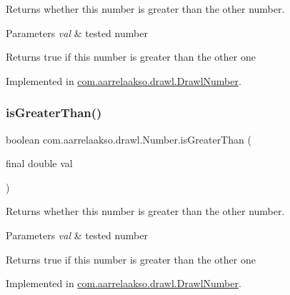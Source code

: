 Returns whether this number is greater than the other number. 


\begin{DoxyParams}{Parameters}
{\em val} & tested number \\
\hline
\end{DoxyParams}
\begin{DoxyReturn}{Returns}
true if this number is greater than the other one 
\end{DoxyReturn}


Implemented in \hyperlink{classcom_1_1aarrelaakso_1_1drawl_1_1_drawl_number_a17616696cef2e7b72d2614481182293a}{com.\+aarrelaakso.\+drawl.\+Drawl\+Number}.

\mbox{\label{interfacecom_1_1aarrelaakso_1_1drawl_1_1_number_ab3c02c742e083e6850ee6d2fe88e985b}} 
\subsubsection{\texorpdfstring{is\+Greater\+Than()}{isGreaterThan()}\hspace{0.1cm}{\footnotesize\ttfamily [2/2]}}
{\footnotesize\ttfamily boolean com.\+aarrelaakso.\+drawl.\+Number.\+is\+Greater\+Than (\begin{DoxyParamCaption}\item[{final double}]{val }\end{DoxyParamCaption})}



Returns whether this number is greater than the other number. 


\begin{DoxyParams}{Parameters}
{\em val} & tested number \\
\hline
\end{DoxyParams}
\begin{DoxyReturn}{Returns}
true if this number is greater than the other one 
\end{DoxyReturn}


Implemented in \hyperlink{classcom_1_1aarrelaakso_1_1drawl_1_1_drawl_number_ae60f5bdfeec3c50dec35e5310f163fa4}{com.\+aarrelaakso.\+drawl.\+Drawl\+Number}.

\mbox{\label{interfacecom_1_1aarrelaakso_1_1drawl_1_1_number_a9c3df12a860251807827d670994b89a4}} 
